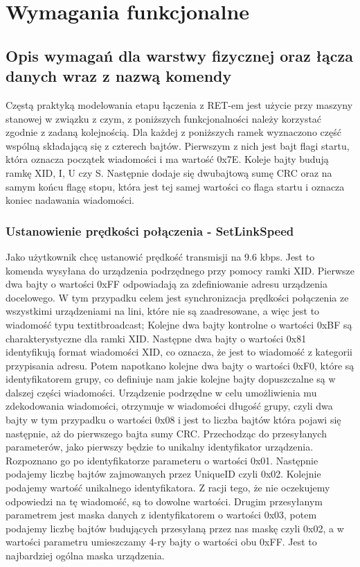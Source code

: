 \chapter{Wymagania funkcjonalne}
	\section{Opis wymagań dla warstwy fizycznej oraz łącza danych wraz z nazwą komendy}
		\noindent
		Częstą praktyką modelowania etapu łączenia z RET-em jest użycie przy maszyny stanowej w związku z czym, z poniższych funkcjonalności należy korzystać zgodnie z zadaną kolejnością.
		Dla każdej z poniższych ramek wyznaczono część wspólną składającą się z czterech bajtów. Pierwszym z nich jest bajt flagi startu, która oznacza początek wiadomości i ma wartość 0x7E.
		Koleje bajty budują ramkę XID, I, U czy S. Następnie dodaje się dwubajtową sumę CRC oraz na samym końcu flagę stopu, która jest tej samej wartości co flaga startu i oznacza koniec nadawania wiadomości.
		\subsection{Ustanowienie prędkości połączenia - SetLinkSpeed}
			Jako użytkownik chcę ustanowić prędkość transmisji na 9.6 kbps.
			\newline\newline
			Jest to komenda wysyłana do urządzenia podrzędnego przy pomocy ramki XID.
			\newline
			Pierwsze dwa bajty o wartości 0xFF odpowiadają za zdefiniowanie adresu urządzenia docelowego. 
			W tym przypadku celem jest synchronizacja prędkości połączenia ze wszystkimi urządzeniami na lini, które nie są zaadresowane, a więc jest to wiadomość typu textit{broadcast};
			\newline
			Kolejne dwa bajty kontrolne o wartości 0xBF są charakterystyczne dla ramki XID.
			\newline
			Następne dwa bajty o wartości 0x81 identyfikują format wiadomości XID, co oznacza, że jest to wiadomość z kategorii przypisania adresu.
			\newline
			Potem napotkano kolejne dwa bajty o wartości 0xF0, które są identyfikatorem grupy, co definiuje nam jakie kolejne bajty dopuszczalne są w dalszej części wiadomości.
			\newline
			Urządzenie podrzędne w celu umożliwienia mu zdekodowania wiadomości, otrzymuje w wiadomości długość grupy, czyli dwa bajty w tym przypadku o wartości 0x08 i jest to 
			liczba bajtów która pojawi się następnie, aż do pierwszego bajta sumy CRC.
			\newline
			Przechodząc do przesyłanych parameterów, jako pierwszy będzie to unikalny identyfikator urządzenia. Rozpoznano go po identyfikatorze parameteru o wartości 0x01.
			Następnie podajemy liczbę bajtów zajmowanych przez UniqueID czyli 0x02. Kolejnie podajemy wartość unikalnego identyfikatora. Z racji tego, że nie oczekujemy odpowiedzi
			na tę wiadomość, są to dowolne wartości.
			Drugim przesyłanym parametrem jest maska danych z identyfikatorem o wartości 0x03, potem podajemy liczbę bajtów budujących przesyłaną przez nas maskę czyli 0x02, a w wartości 
			parametru umieszczamy 4-ry bajty o wartości obu 0xFF. Jest to najbardziej ogólna maska urządzenia.
